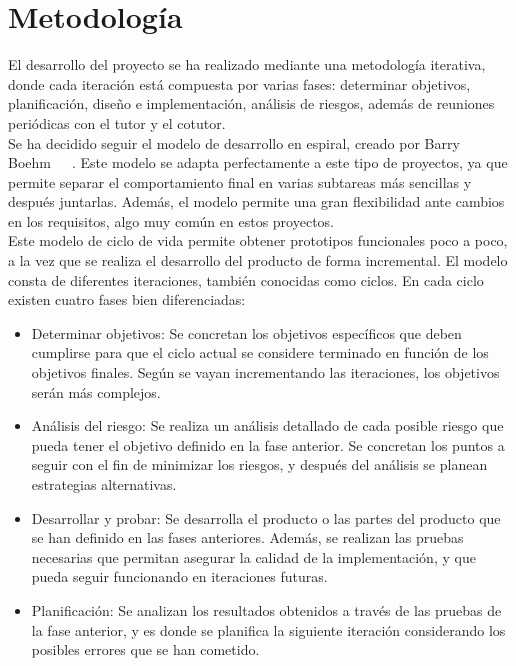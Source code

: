 \section{Metodología}

El desarrollo del proyecto se ha realizado mediante una metodología iterativa, donde cada iteración está compuesta por varias fases: determinar objetivos, planificación, diseño e implementación, análisis de riesgos, además de reuniones periódicas con el tutor y el cotutor.\\

Se ha decidido seguir el modelo de desarrollo en espiral, creado por Barry Boehm~\cite{modelo_espiral}~\cite{modelo_espiral1}~\cite{modelo_espiral2}. Este modelo se adapta perfectamente a este tipo de proyectos, ya que permite separar el comportamiento final en varias subtareas más sencillas y después juntarlas. Además, el modelo permite una gran flexibilidad ante cambios en los requisitos, algo muy común en estos proyectos.\\

Este modelo de ciclo de vida permite obtener prototipos funcionales poco a poco, a la vez que se realiza el desarrollo del producto de forma incremental. El modelo consta de diferentes iteraciones, también conocidas como ciclos. En cada ciclo existen cuatro fases bien diferenciadas:

\begin{itemize}
    \item Determinar objetivos: Se concretan los objetivos específicos que deben cumplirse para que el ciclo actual se considere terminado en función de los objetivos finales. Según se vayan incrementando las iteraciones, los objetivos serán más complejos.

    \item Análisis del riesgo: Se realiza un análisis detallado de cada posible riesgo que pueda tener el objetivo definido en la fase anterior. Se concretan los puntos a seguir con el fin de minimizar los riesgos, y después del análisis se planean estrategias alternativas.
    
    \item Desarrollar y probar: Se desarrolla el producto o las partes del producto que se han definido en las fases anteriores. Además, se realizan las pruebas necesarias que permitan asegurar la calidad de la implementación, y que pueda seguir funcionando en iteraciones futuras.
    
    \item Planificación: Se analizan los resultados obtenidos a través de las pruebas de la fase anterior, y es donde se planifica la siguiente iteración considerando los posibles errores que se han cometido.
\end{itemize}


